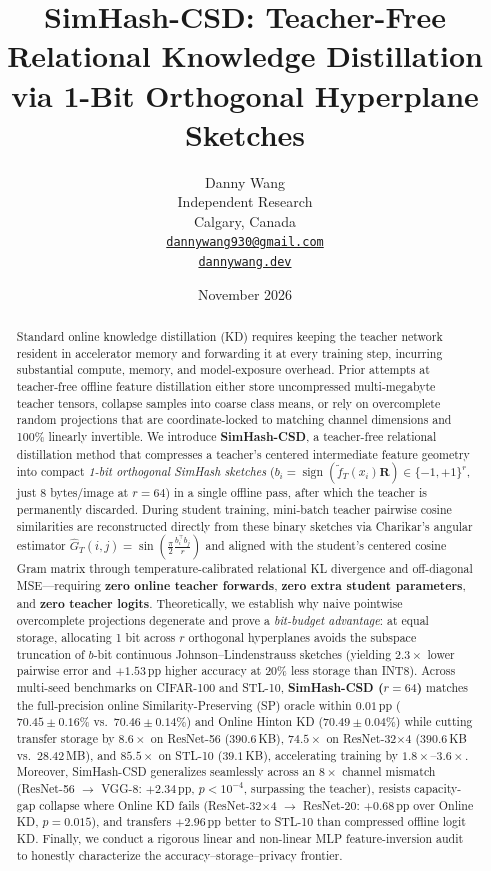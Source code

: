 \documentclass{article}
\title{SimHash-CSD: Teacher-Free Relational Knowledge Distillation via 1-Bit Orthogonal Hyperplane Sketches}
\date{November 2026}
\author{Danny Wang \\
	Independent Research \\
	Calgary, Canada \\
	\href{mailto:dannywang930@gmail.com}{\texttt{dannywang930@gmail.com}} \\
	\href{https://dannywang.dev}{\texttt{dannywang.dev}} \\
}
\begin{document}
\maketitle

\begin{abstract}
Standard online knowledge distillation (KD) requires keeping the teacher network resident in accelerator memory and forwarding it at every training step, incurring substantial compute, memory, and model-exposure overhead. Prior attempts at teacher-free offline feature distillation either store uncompressed multi-megabyte teacher tensors, collapse samples into coarse class means, or rely on overcomplete random projections that are coordinate-locked to matching channel dimensions and 100\% linearly invertible. We introduce \textbf{SimHash-CSD}, a teacher-free relational distillation method that compresses a teacher's centered intermediate feature geometry into compact \emph{1-bit orthogonal SimHash sketches} ($b_i = \operatorname{sign}(\tilde{f}_T(x_i)\mathbf{R}) \in \{-1,+1\}^r$, just 8 bytes/image at $r=64$) in a single offline pass, after which the teacher is permanently discarded. During student training, mini-batch teacher pairwise cosine similarities are reconstructed directly from these binary sketches via Charikar's angular estimator $\hat{G}_T(i,j)=\sin(\frac{\pi}{2}\frac{b_i^\top b_j}{r})$ and aligned with the student's centered cosine Gram matrix through temperature-calibrated relational KL divergence and off-diagonal MSE---requiring \textbf{zero online teacher forwards}, \textbf{zero extra student parameters}, and \textbf{zero teacher logits}. Theoretically, we establish why naive pointwise overcomplete projections degenerate and prove a \emph{bit-budget advantage}: at equal storage, allocating 1 bit across $r$ orthogonal hyperplanes avoids the subspace truncation of $b$-bit continuous Johnson--Lindenstrauss sketches (yielding $2.3\times$ lower pairwise error and $+1.53$\,pp higher accuracy at 20\% less storage than INT8). Across multi-seed benchmarks on CIFAR-100 and STL-10, \textbf{SimHash-CSD ($r=64$)} matches the full-precision online Similarity-Preserving (SP) oracle within $0.01$\,pp ($70.45\pm0.16\%$ vs.\ $70.46\pm0.14\%$) and Online Hinton KD ($70.49\pm0.04\%$) while cutting transfer storage by $8.6\times$ on ResNet-56 ($390.6$\,KB), $74.5\times$ on ResNet-32$\times$4 ($390.6$\,KB vs.\ $28.42$\,MB), and $85.5\times$ on STL-10 ($39.1$\,KB), accelerating training by $1.8\times$--$3.6\times$. Moreover, SimHash-CSD generalizes seamlessly across an $8\times$ channel mismatch (ResNet-56 $\to$ VGG-8: $+2.34$\,pp, $p<10^{-4}$, surpassing the teacher), resists capacity-gap collapse where Online KD fails (ResNet-32$\times$4 $\to$ ResNet-20: $+0.68$\,pp over Online KD, $p=0.015$), and transfers $+2.96$\,pp better to STL-10 than compressed offline logit KD. Finally, we conduct a rigorous linear and non-linear MLP feature-inversion audit to honestly characterize the accuracy--storage--privacy frontier.
\end{abstract}
\end{document}
